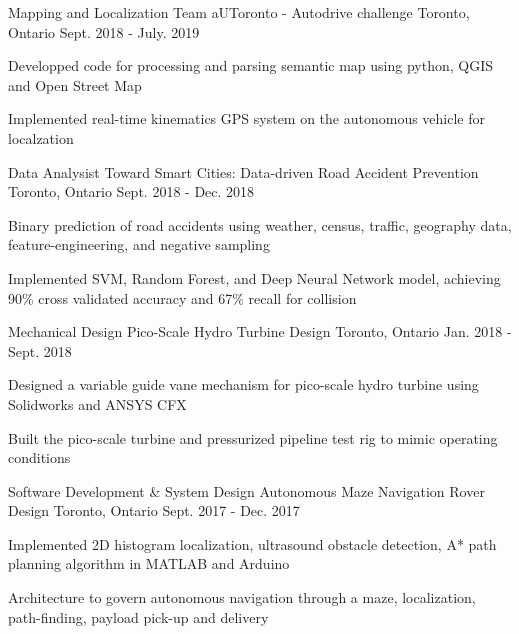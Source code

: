 \begin{cventries}
  \cventry
  {Mapping and Localization Team}
  {aUToronto - Autodrive challenge}
  {Toronto, Ontario}
  {Sept. 2018 - July. 2019}
  {
    \begin{cvitems}
      \item {Developped code for processing and parsing semantic map using python, QGIS and Open Street Map}
      \item {Implemented real-time kinematics GPS system on the autonomous vehicle for localzation}
    \end{cvitems}
  }

  \cventry
  {Data Analysist}
  {Toward Smart Cities: Data-driven Road Accident Prevention}
  {Toronto, Ontario}
  {Sept. 2018 - Dec. 2018}
  {
    \begin{cvitems}
      \item {Binary prediction of road accidents using weather, census, traffic, geography data, feature-engineering, and negative sampling}
      \item {Implemented SVM, Random Forest, and Deep Neural Network model, achieving 90\% cross validated accuracy and 67\% recall for collision}
    \end{cvitems}
  }

  \cventry
    {Mechanical Design}
    {Pico-Scale Hydro Turbine Design}
    {Toronto, Ontario}
    {Jan. 2018 - Sept. 2018}
    {
      \begin{cvitems}
        \item {Designed a variable guide vane mechanism for pico-scale hydro turbine using Solidworks and ANSYS CFX}
        \item {Built the pico-scale turbine and pressurized pipeline test rig to mimic operating conditions}
      \end{cvitems}
    }

    \cventry
    {Software Development \& System Design}
    {Autonomous Maze Navigation Rover Design}
    {Toronto, Ontario}
    {Sept. 2017 - Dec. 2017}
    {
      \begin{cvitems}
        \item {Implemented 2D histogram localization, ultrasound obstacle detection, A* path planning algorithm in MATLAB and Arduino}
        \item {Architecture to govern autonomous navigation through a maze, localization, path-finding, payload pick-up and delivery}
      \end{cvitems}
    }


\end{cventries}
